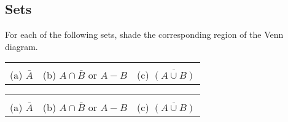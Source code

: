\begin{questions}


\section*{Sets}


 For each of the following sets, shade the corresponding region of the Venn diagram.
\ifprintanswers
    \vspace{-15pt}
\else
\begin{tabular}{ccc}
	\begin{venndiagram2sets}
	\end{venndiagram2sets}
	& 
	\begin{venndiagram2sets}
	\end{venndiagram2sets}
	&
	\begin{venndiagram2sets}
	\end{venndiagram2sets}
	\\
	(a) $\bar{A}$ & 
	(b) $A \cap \bar{B}$ or $A - B$ &
	(c) $\overline{(A \cup B)}$
\end{tabular}
\fi
	\begin{EnvFullwidth}
	\begin{solution}

		\begin{tabular}{ccc}
			\begin{venndiagram2sets}
				\fillNotA
			\end{venndiagram2sets}
			& 
			\begin{venndiagram2sets}
				\fillANotB
			\end{venndiagram2sets}
			&
			\begin{venndiagram2sets}
				\fillNotAorB
			\end{venndiagram2sets}
			\\
			(a) $\bar{A}$ & 
			(b) $A \cap \bar{B}$ or $A - B$ &
			(c) $\overline{(A \cup B)}$
		\end{tabular}
	\end{solution}
	\end{EnvFullwidth}





\end{questions}
